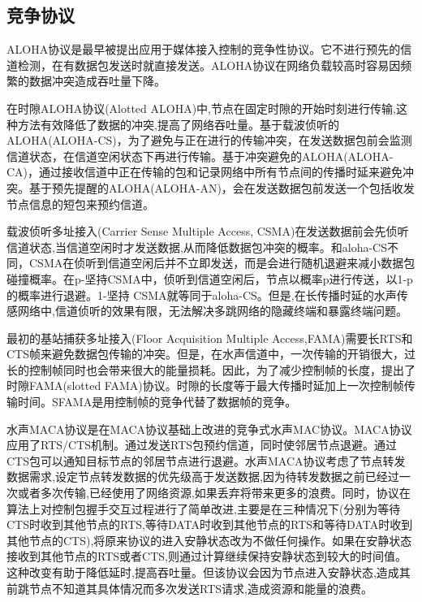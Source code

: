 \subsection{竞争协议}
ALOHA协议是最早被提出应用于媒体接入控制的竞争性协议。它不进行预先的信道检测，在有数据包发送时就直接发送。ALOHA协议在网络负载较高时容易因频繁的数据冲突造成吞吐量下降。

在时隙ALOHA协议(Alotted ALOHA)中,节点在固定时隙的开始时刻进行传输,这种方法有效降低了数据的冲突,提高了网络吞吐量。基于载波侦听的ALOHA(ALOHA-CS)\cite{chirdchoo2007aloha}，为了避免与正在进行的传输冲突，在发送数据包前会监测信道状态，在信道空闲状态下再进行传输。基于冲突避免的ALOHA(ALOHA-CA)\cite{chirdchoo2007aloha}，通过接收信道中正在传输的包和记录网络中所有节点间的传播时延来避免冲突。基于预先提醒的ALOHA(ALOHA-AN)\cite{chirdchoo2007aloha}，会在发送数据包前发送一个包括收发节点信息的短包来预约信道。

载波侦听多址接入(Carrier Sense Multiple Access, CSMA)在发送数据前会先侦听信道状态,当信道空闲时才发送数据,从而降低数据包冲突的概率。和aloha-CS不同，CSMA在侦听到信道空闲后并不立即发送，而是会进行随机退避来减小数据包碰撞概率。在p-坚持CSMA中，侦听到信道空闲后，节点以概率p进行传送，以1-p的概率进行退避。1-坚持 CSMA就等同于aloha-CS。但是,在长传播时延的水声传感网络中,信道侦听的效果有限，无法解决多跳网络的隐藏终端和暴露终端问题。

最初的基站捕获多址接入(Floor Acquisition Multiple Access,FAMA)需要长RTS和CTS帧来避免数据包传输的冲突。但是，在水声信道中，一次传输的开销很大，过长的控制帧同时也会带来很大的能量损耗。因此，为了减少控制帧的长度，提出了时隙FAMA(slotted FAMA)\cite{molins2007slotted}协议。时隙的长度等于最大传播时延加上一次控制帧传输时间。SFAMA是用控制帧的竞争代替了数据帧的竞争。

水声MACA\cite{ng2008maca}协议是在MACA协议基础上改进的竞争式水声MAC协议。MACA协议应用了RTS/CTS机制。通过发送RTS包预约信道，同时使邻居节点退避。通过CTS包可以通知目标节点的邻居节点进行退避。水声MACA协议考虑了节点转发数据需求,设定节点转发数据的优先级高于发送数据,因为待转发数据之前已经过一次或者多次传输,已经使用了网络资源,如果丢弃将带来更多的浪费。同时，协议在算法上对控制包握手交互过程进行了简单改进,主要是在三种情况下(分别为等待CTS时收到其他节点的RTS,等待DATA时收到其他节点的RTS和等待DATA时收到其他节点的CTS),将原来协议的进入安静状态改为不做任何操作。如果在安静状态接收到其他节点的RTS或者CTS,则通过计算继续保持安静状态到较大的时间值。这种改变有助于降低延时,提高吞吐量。但该协议会因为节点进入安静状态,造成其前跳节点不知道其具体情况而多次发送RTS请求,造成资源和能量的浪费。

